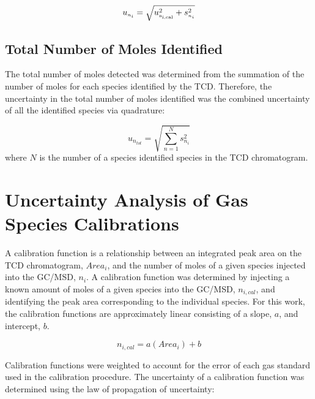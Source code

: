 \documentclass[12pt]{article}
\begin{document}
\begin{equation}
\label{eq:gasspeciesuncertaintycertainty}
u_{\scriptscriptstyle n_{i}} = \sqrt{ u_{\rm \scriptscriptstyle n_{i,cal}}^2 + s_{\scriptscriptstyle n_{i}}^2}
\end{equation}

\subsection{Total Number of Moles Identified}
\label{ssec:Total Number of Moles Identified}
The total number of moles detected was determined from the summation of the number of moles for each species identified by the TCD. Therefore, the uncertainty in the total number of moles identified was the combined uncertainty of all the identified species via quadrature:

\begin{equation}
\label{eq:totalnumberofmolesdetected}
u_{\scriptscriptstyle n_{tot}}=\sqrt{{\sum_{n=1}^{N} s_{\scriptscriptstyle n_{i}}^2}}
\end{equation}
where $N$ is the number of a species identified species in the TCD chromatogram. 

\pagebreak

\section{Uncertainty Analysis of Gas Species Calibrations}\label{sec:Uncertainty Analysis of Gas Species Calibrations}

A calibration function is a relationship between an integrated peak area on the TCD chromatogram, $Area_{i}$, and the number of moles of a given species injected into the GC/MSD, $n_{i}$. A calibration function was determined by injecting a known amount of moles of a given species into the GC/MSD, $n_{i,cal}$, and identifying the peak area corresponding to the individual species. For this work, the calibration functions are approximately linear consisting of a slope, $a$, and intercept, $b$.

\begin{equation}
\label{eq:Calibration Curve}
n_{i,cal} = a(Area_{i})+b
\end{equation}

Calibration functions were weighted to account for the error of each gas standard used in the calibration procedure. The uncertainty of a calibration function was determined using the law of propagation of uncertainty:
\end{document}
